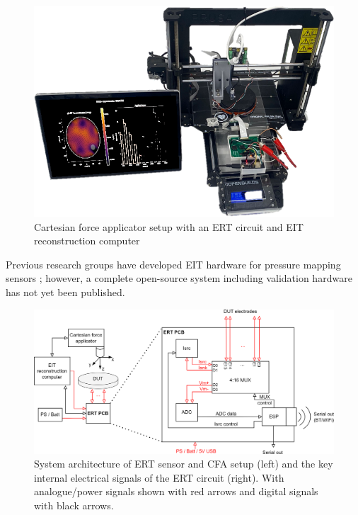 \begin{figure}[H]
	\centering
	\includegraphics[width=0.6\linewidth]{Figures/cfa_screen_pic.png}
	\caption{Cartesian force applicator setup with an ERT circuit and EIT reconstruction computer}
	\label{fig:cfa_setup}
\end{figure} 
Previous research groups have developed EIT hardware for pressure mapping sensors \cite{Chen2023,Zhang2017b,Visentin2016,Yoon2017,Sun2020}; however, a complete open-source system including validation hardware has not yet been published. 


\begin{figure}[H]
\centering
\includegraphics[width=\linewidth]{Figures/ERT_PCB_and_CFA_system.png}
\caption{System architecture of ERT sensor and CFA setup (left) and the key internal electrical signals of the ERT circuit (right). With analogue/power signals shown with red arrows and digital signals with black arrows.}
\label{fig:ERT_PCB_CFA_archit_full}
\end{figure}


